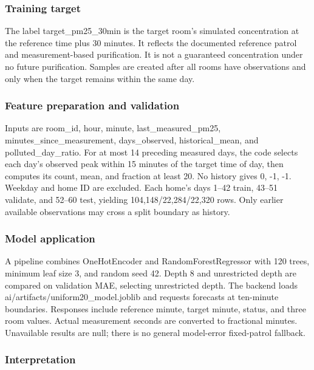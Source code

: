 \documentclass[conference]{IEEEtran}
\begin{document}
\subsubsection{Training target}

The label target\_\allowbreak{}pm25\_\allowbreak{}30min is the target room's simulated concentration at the reference time plus 30 minutes. It reflects the documented reference patrol and measurement-based purification. It is not a guaranteed concentration under no future purification. Samples are created after all rooms have observations and only when the target remains within the same day.

\subsubsection{Feature preparation and validation}

Inputs are room\_\allowbreak{}id, hour, minute, last\_\allowbreak{}measured\_\allowbreak{}pm25, minutes\_\allowbreak{}since\_\allowbreak{}measurement, days\_\allowbreak{}observed, historical\_\allowbreak{}mean, and polluted\_\allowbreak{}day\_\allowbreak{}ratio. For at most 14 preceding measured days, the code selects each day's observed peak within 15 minutes of the target time of day, then computes its count, mean, and fraction at least 20. No history gives 0, -1, -1. Weekday and home ID are excluded. Each home's days 1--42 train, 43--51 validate, and 52--60 test, yielding 104,148/22,284/22,320 rows. Only earlier available observations may cross a split boundary as history.

\subsubsection{Model application}

A pipeline combines OneHotEncoder and RandomForestRegressor with 120 trees, minimum leaf size 3, and random seed 42. Depth 8 and unrestricted depth are compared on validation MAE, selecting unrestricted depth. The backend loads ai/artifacts/uniform20\_\allowbreak{}model.joblib and requests forecasts at ten-minute boundaries. Responses include reference minute, target minute, status, and three room values. Actual measurement seconds are converted to fractional minutes. Unavailable results are null; there is no general model-error fixed-patrol fallback. \cite{ref6}

\subsubsection{Interpretation}
\end{document}

